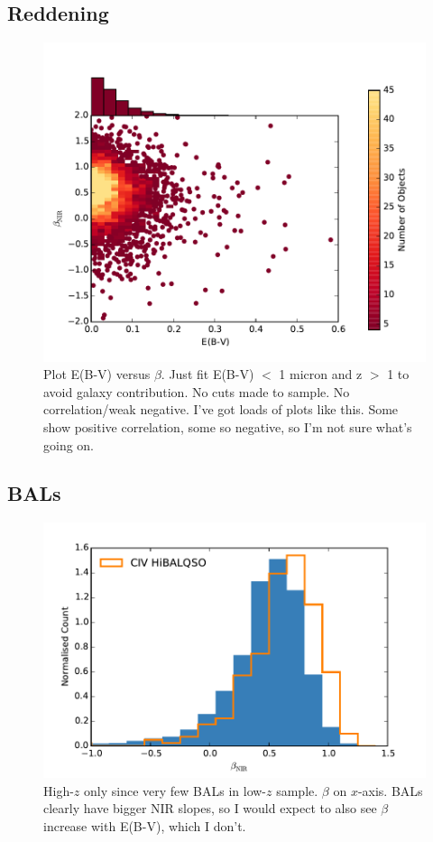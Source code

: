 \subsection{Reddening}

\begin{figure}
\centering
  \includegraphics[width=\columnwidth]{figures/chapter06/ebv_beta}
\caption{Plot E(B-V) versus $\beta$. Just fit E(B-V) $<$ 1 micron and z $>$ 1 to avoid galaxy contribution. No cuts made to sample. No correlation/weak negative. I've got loads of plots like this. Some show positive correlation, some so negative, so I'm not sure what's going on.}
  \label{fig:fig}
\end{figure}

\subsection{BALs}

\begin{figure}
\centering
  \includegraphics[width=\columnwidth]{figures/chapter06/BALs_hist}
\caption{High-$z$ only since very few BALs in low-$z$ sample. $\beta$ on $x$-axis. BALs clearly have bigger NIR slopes, so I would expect to also see $\beta$ increase with E(B-V), which I don't.}
  \label{fig:fig}
\end{figure}

